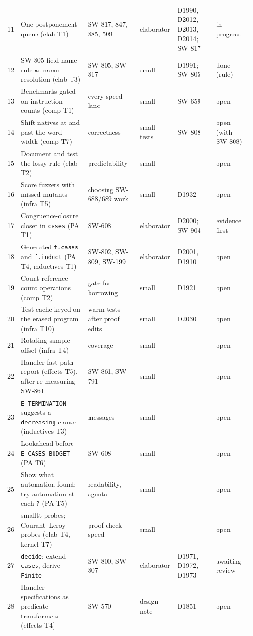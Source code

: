 \documentclass[11pt,a4paper]{article}
\newcommand{\code}[1]{\texttt{#1}}
\begin{document}
\begin{longtable}{@{}rL{5.2cm}L{2.45cm}L{1.85cm}L{2.4cm}L{1.6cm}@{}}
11 & One postponement queue (elab T1) & SW-817, 847, 885, 509 & elaborator & D1990, D2012, D2013, D2014; SW-817 & in progress \\
12 & SW-805 field-name rule as name resolution (elab T3) & SW-805, SW-817 & small & D1991; SW-805 & done (rule) \\
13 & Benchmarks gated on instruction counts (comp T1) & every speed lane & small & SW-659 & open \\
14 & Shift natives at and past the word width (comp T7) & correctness & small tests & SW-808 & open (with SW-808) \\
15 & Document and test the lossy rule (elab T2) & predictability & small & --- & open \\
16 & Score fuzzers with missed mutants (infra T5) & choosing SW-688/689 work & small & D1932 & open \\
17 & Congruence-closure closer in \code{cases} (PA T1) & SW-608 & elaborator & D2000; SW-904 & evidence first \\
18 & Generated \code{f.cases} and \code{f.induct} (PA T4, inductives T1) & SW-802, SW-809, SW-199 & elaborator & D2001, D1910 & open \\
19 & Count reference-count operations (comp T2) & gate for borrowing & small & D1921 & open \\
20 & Test cache keyed on the erased program (infra T10) & warm tests after proof edits & small & D2030 & open \\
21 & Rotating sample offset (infra T4) & coverage & small & --- & open \\
22 & Handler fast-path report (effects T5), after re-measuring SW-861 & SW-861, SW-791 & small & --- & open \\
23 & \code{E-TERMINATION} suggests a \code{decreasing} clause (inductives T3) & messages & small & --- & open \\
24 & Lookahead before \code{E-CASES-BUDGET} (PA T6) & SW-608 & small & --- & open \\
25 & Show what automation found; try automation at each \code{?} (PA T5) & readability, agents & small & --- & open \\
26 & smalltt probes; Courant--Leroy probes (elab T4, kernel T7) & proof-check speed & small & --- & open \\
27 & \code{decide}: extend \code{cases}, derive \code{Finite} & SW-800, SW-807 & elaborator & D1971, D1972, D1973 & awaiting review \\
28 & Handler specifications as predicate transformers (effects T4) & SW-570 & design note & D1851 & open \\

\end{longtable}
\end{document}
